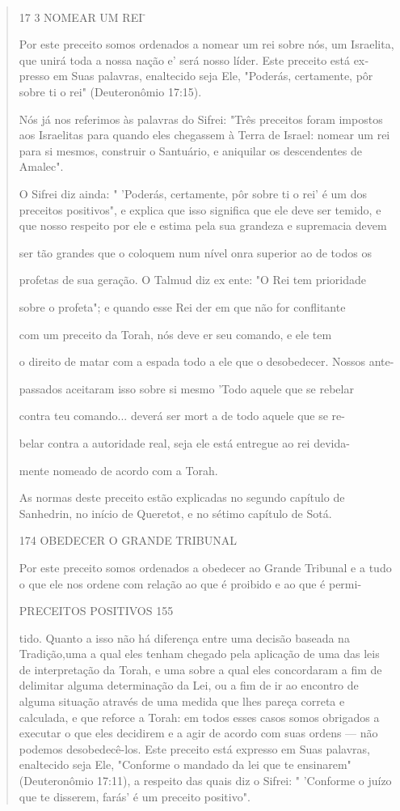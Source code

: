\begin{quote}
17 3 NOMEAR UM REI\textsuperscript{-}

Por este preceito somos ordenados a nomear um rei sobre nós, um
Israelita, que unirá toda a nossa nação e' será nosso líder. Este
preceito está ex­presso em Suas palavras, enaltecido seja Ele, "Poderás,
certamente, pôr sobre ti o rei" (Deuteronômio 17:15).

Nós já nos referimos às palavras do Sifrei: "Três preceitos foram
im­postos aos Israelitas para quando eles chegassem à Terra de Israel:
nomear um rei para si mesmos, construir o Santuário, e aniquilar os
descendentes de Amalec".

O Sifrei diz ainda: " 'Poderás, certamente, pôr sobre ti o rei' é um dos
preceitos positivos", e explica que isso significa que ele deve ser
temido, e que nosso respeito por ele e estima pela sua grandeza e
supremacia devem

ser tão grandes que o coloquem num nível onra superior ao de todos os

profetas de sua geração. O Talmud diz ex ente: "O Rei tem prioridade

sobre o profeta"; e quando esse Rei der em que não for conflitante

com um preceito da Torah, nós deve er seu comando, e ele tem

o direito de matar com a espada todo a ele que o desobedecer. Nossos
ante-

passados aceitaram isso sobre si mesmo 'Todo aquele que se rebelar

contra teu comando... deverá ser mort a de todo aquele que se re-

belar contra a autoridade real, seja ele está entregue ao rei devida-

mente nomeado de acordo com a Torah.

As normas deste preceito estão explicadas no segundo capítulo de
Sanhedrin, no início de Queretot, e no sétimo capítulo de Sotá.

174 OBEDECER O GRANDE TRIBUNAL

Por este preceito somos ordenados a obedecer ao Grande Tribunal e a tudo
o que ele nos ordene com relação ao que é proibido e ao que é permi-

PRECEITOS POSITIVOS 155

tido. Quanto a isso não há diferença entre uma decisão baseada na
Tradição,uma a qual eles tenham chegado pela aplicação de uma das leis
de interpretação da Torah, e uma sobre a qual eles concordaram a fim de
delimitar alguma determi­nação da Lei, ou a fim de ir ao encontro de
alguma situação através de uma medida que lhes pareça correta e
calculada, e que reforce a Torah: em todos esses casos somos obrigados a
executar o que eles decidirem e a agir de acordo com suas ordens --- não
podemos desobedecê-los. Este preceito está expresso em Suas palavras,
enaltecido seja Ele, "Conforme o mandado da lei que te ensi­narem"
(Deuteronômio 17:11), a respeito das quais diz o Sifrei: " 'Conforme o
juízo que te disserem, farás' é um preceito positivo".
\end{quote}

